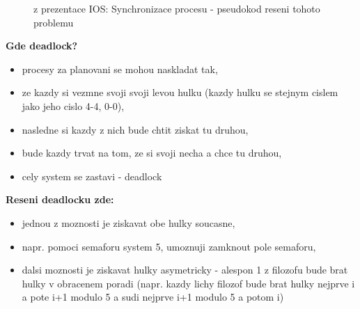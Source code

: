 \documentclass[a4paper, 11pt]{article}
\begin{document}
\begin{figure} [htb]
    \centering
    \caption{z prezentace IOS: Synchronizace procesu - pseudokod reseni tohoto problemu}
\end{figure}

\newpage

\textbf{Gde deadlock?}
\begin{itemize}
    \item procesy za planovani se mohou naskladat tak,
    \item ze kazdy si vezmne svoji svoji levou hulku (kazdy hulku se stejnym cislem jako jeho cislo 4-4, 0-0),
    \item nasledne si kazdy z nich bude chtit ziskat tu druhou,
    \item bude kazdy trvat na tom, ze si svoji necha a chce tu druhou,
    \item cely system se zastavi - deadlock \\
\end{itemize}

\textbf{Reseni deadlocku zde:}
\begin{itemize}
    \item jednou z moznosti je ziskavat obe hulky soucasne,
    \item napr. pomoci semaforu system 5, umoznuji zamknout pole semaforu,
    \item dalsi moznosti je ziskavat hulky asymetricky - alespon 1 z filozofu bude brat hulky v obracenem poradi (napr. kazdy lichy filozof bude brat hulky nejprve i a pote i+1 modulo 5 a sudi nejprve i+1 modulo 5 a potom i) \\
\end{itemize}
\end{document}
